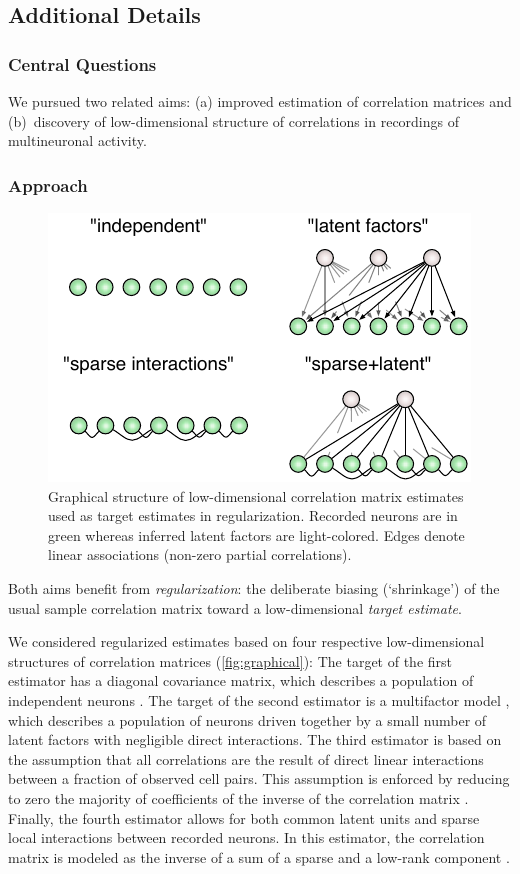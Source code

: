 \documentclass[12pt]{amsart}
\begin{document}
\subsection*{Additional Details}
\subsubsection*{Central Questions} We pursued two related aims: (a) improved estimation of correlation matrices and (b)~discovery of low-dimensional structure of correlations in recordings of multineuronal activity.
\subsubsection*{Approach}
\begin{figure}
\centering
\vspace{-6pt}
\includegraphics{./Simulation.pdf}
\caption{Graphical structure of low-dimensional correlation matrix estimates used as target estimates in regularization. Recorded neurons are in green whereas inferred latent factors are light-colored. Edges denote linear associations (non-zero partial correlations).}
\label{fig:graphical}
\end{figure}
Both aims benefit from \emph{regularization}: the deliberate biasing (`shrinkage') of the usual sample correlation matrix toward a low-dimensional \emph{target estimate}. 

We considered regularized estimates based on four respective low-dimensional structures of correlation matrices (\autoref{fig:graphical}): 
The target of the first estimator has a diagonal covariance matrix, which describes a population of independent neurons \cite{Ledoit:2004}. 
The target of the second estimator is a multifactor model \cite{Fan:2008}, which describes a population of neurons driven together by a small number of latent factors with negligible direct interactions.
The third estimator is based on the assumption that all correlations are the result of direct linear interactions between a fraction of observed cell pairs. This assumption is enforced by reducing to zero the majority of coefficients of the inverse of the correlation matrix \cite{Dempster:1972}. 
Finally, the fourth estimator allows for both common latent units and sparse local interactions between recorded neurons.  
In this estimator, the correlation matrix is modeled as the inverse of a sum of a sparse and a low-rank component \cite{Ma:2013}.
\end{document}
